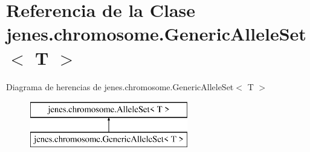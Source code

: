\hypertarget{classjenes_1_1chromosome_1_1_generic_allele_set_3_01_t_01_4}{\section{Referencia de la Clase jenes.\-chromosome.\-Generic\-Allele\-Set$<$ T $>$}
\label{classjenes_1_1chromosome_1_1_generic_allele_set_3_01_t_01_4}
}
Diagrama de herencias de jenes.\-chromosome.\-Generic\-Allele\-Set$<$ T $>$\begin{figure}[H]
\begin{center}
\leavevmode
\includegraphics[height=2.000000cm]{classjenes_1_1chromosome_1_1_generic_allele_set_3_01_t_01_4}
\end{center}
\end{figure}
